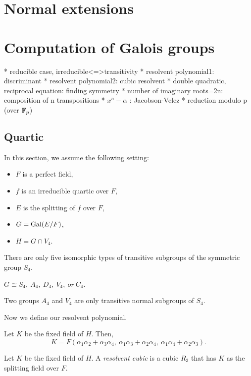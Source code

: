 \documentclass{../exp}
\begin{document}
\section{Normal extensions}










\section{Computation of Galois groups}

 * reducible case, irreducible<=>transitivity
 * resolvent polynomial1: discriminant
 * resolvent polynomial2: cubic resolvent
 * double quadratic, reciprocal equation: finding symmetry
 * number of imaginary roots=2n: composition of n transpositions
 * $x^n-\alpha$ :  Jacobson-Velez
 * reduction modulo p (over $\mathbb{F}_p$)

\subsection{Quartic}
In this section, we assume the following setting:
\begin{itemize}
\item $F$ is a perfect field, %
\item $f$ is an irreducible quartic over $F$,
\item $E$ is the splitting of $f$ over $F$,
\item $G=\operatorname{Gal}(E/F)$,
\item $H=G\cap V_4$. 
\end{itemize}
\begin{thm}
There are only five isomorphic types of transitive subgroups of the symmetric group $S_4$.
\end{thm}
\begin{cor}
$G\cong S_4,\ A_4,\ D_4,\ V_4,\ or\ C_4$.
\end{cor}
\begin{prop}
Two groups $A_4$ and $V_4$ are only transitive normal subgroups of $S_4$.
\end{prop}

Now we define our resolvent polynomial.
\begin{prop}
Let $K$ be the fixed field of $H$.
Then,
\[K=F(\alpha_1\alpha_2+\alpha_3\alpha_4,\ \alpha_1\alpha_3+\alpha_2\alpha_4,\ \alpha_1\alpha_4+\alpha_2\alpha_3).\]
\end{prop}
\begin{defn}
Let $K$ be the fixed field of $H$.
A \emph{resolvent cubic} is a cubic $R_3$ that has $K$ as the splitting field over $F$.
\end{defn}
\end{document}
